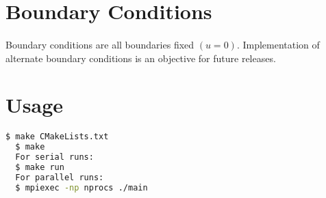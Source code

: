 \documentclass[11pt]{article}
\begin{document}
\section{Boundary Conditions}
\paragraph{}
Boundary conditions are all boundaries fixed $(u=0)$.  Implementation of alternate boundary conditions is an objective for future releases.

\section{Usage}
\paragraph{}
\noindent
\begin{lstlisting}[language=bash]
  $ make CMakeLists.txt
  $ make
  For serial runs:
  $ make run
  For parallel runs:
  $ mpiexec -np nprocs ./main
\end{lstlisting}
\end{document}

